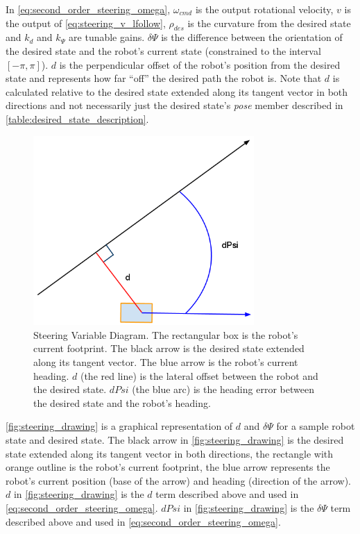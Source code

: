 In \eqref{eq:second_order_steering_omega}, $\omega_{cmd}$ is the output rotational velocity, $v$ is the output of \eqref{eq:steering_v_lfollow}, $\rho_{des}$ is the curvature from the desired state and $k_d$ and $k_{\Psi}$ are tunable gains. $\delta\Psi$ is the difference between the orientation of the desired state and the robot's current state (constrained to the interval $\left[-\pi,\pi\right]$). $d$ is the perpendicular offset of the robot's position from the desired state and represents how far ``off'' the desired path the robot is. Note that $d$ is calculated relative to the desired state extended along its tangent vector in both directions and not necessarily just the desired state's \emph{pose} member described in \autoref{table:desired_state_description}. 

\begin{figure}
\centering
\includegraphics[width=0.75\textwidth]{images/steering_drawing}
\caption[Steering Variable Diagram]{Steering Variable Diagram. The rectangular box is the robot's current footprint. The black arrow is the desired state extended along its tangent vector. The blue arrow is the robot's current heading. $d$ (the red line) is the lateral offset between the robot and the desired state. $dPsi$ (the blue arc) is the heading error between the desired state and the robot's heading.}
\label{fig:steering_drawing}
\end{figure}

\autoref{fig:steering_drawing} is a graphical representation of $d$ and $\delta\Psi$ for a sample robot state and desired state. The black arrow in \autoref{fig:steering_drawing} is the desired state extended along its tangent vector in both directions, the rectangle with orange outline is the robot's current footprint, the blue arrow represents the robot's current position (base of the arrow) and heading (direction of the arrow). $d$ in \autoref{fig:steering_drawing} is the $d$ term described above and used in \eqref{eq:second_order_steering_omega}. $dPsi$ in \autoref{fig:steering_drawing} is the $\delta\Psi$ term described above and used in \eqref{eq:second_order_steering_omega}.

